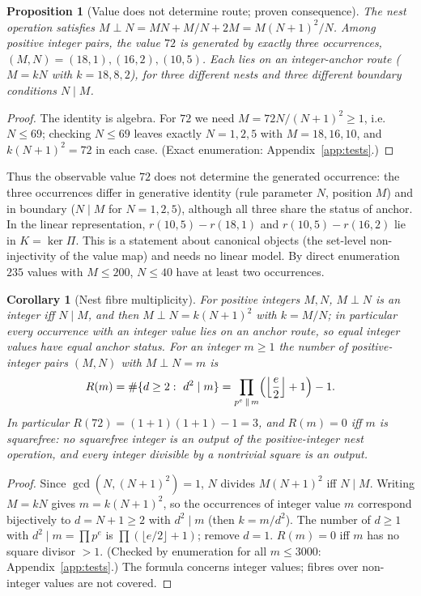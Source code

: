 \documentclass[11pt,a4paper]{article}
\theoremstyle{plain}
\newtheorem{proposition}[theorem]{Proposition}
\newtheorem{corollary}[theorem]{Corollary}
\theoremstyle{definition}
\begin{document}
\begin{proposition}[Value does not determine route; proven consequence]\label{prop:nest}
The nest operation satisfies $M\perp N=MN+M/N+2M=M(N+1)^2/N$. Among positive integer pairs, the value $72$ is generated by exactly three occurrences, $(M,N)=(18,1),(16,2),(10,5)$. Each lies on an integer-anchor route ($M=kN$ with $k=18,8,2$), for three different nests and three different boundary conditions $N\mid M$.
\end{proposition}
\begin{proof}
The identity is algebra. For $72$ we need $M=72N/(N+1)^2\ge1$, i.e.\ $N\le69$; checking $N\le69$ leaves exactly $N=1,2,5$ with $M=18,16,10$, and $k(N+1)^2=72$ in each case. (Exact enumeration: Appendix~\ref{app:tests}.)
\end{proof}
Thus the observable value $72$ does not determine the generated occurrence: the three occurrences differ in generative identity (rule parameter $N$, position $M$) and in boundary ($N\mid M$ for $N=1,2,5$), although all three share the status of anchor. In the linear representation, $r(10,5)-r(18,1)$ and $r(10,5)-r(16,2)$ lie in $K=\ker\Pi$. This is a statement about canonical objects (the set-level non-injectivity of the value map) and needs no linear model. By direct enumeration $235$ values with $M\le200$, $N\le40$ have at least two occurrences.
\begin{corollary}[Nest fibre multiplicity]\label{cor:fibre}
For positive integers $M,N$, $M\perp N$ is an integer iff $N\mid M$, and then $M\perp N=k(N+1)^2$ with $k=M/N$; in particular every occurrence with an integer value lies on an anchor route, so equal integer values have equal anchor status. For an integer $m\ge1$ the number of positive-integer pairs $(M,N)$ with $M\perp N=m$ is
\[R(m)=\#\{d\ge2:\ d^2\mid m\}=\prod_{p^e\,\Vert\, m}\Bigl(\Bigl\lfloor\frac e2\Bigr\rfloor+1\Bigr)-1 .\]
In particular $R(72)=(1+1)(1+1)-1=3$, and $R(m)=0$ iff $m$ is squarefree: no squarefree integer is an output of the positive-integer nest operation, and every integer divisible by a nontrivial square is an output.
\end{corollary}
\begin{proof}
Since $\gcd(N,(N+1)^2)=1$, $N$ divides $M(N+1)^2$ iff $N\mid M$. Writing $M=kN$ gives $m=k(N+1)^2$, so the occurrences of integer value $m$ correspond bijectively to $d=N+1\ge2$ with $d^2\mid m$ (then $k=m/d^2$). The number of $d\ge1$ with $d^2\mid m=\prod p^e$ is $\prod(\lfloor e/2\rfloor+1)$; remove $d=1$. $R(m)=0$ iff $m$ has no square divisor $>1$. (Checked by enumeration for all $m\le3000$: Appendix~\ref{app:tests}.) The formula concerns integer values; fibres over non-integer values are not covered.
\end{proof}
\end{document}
